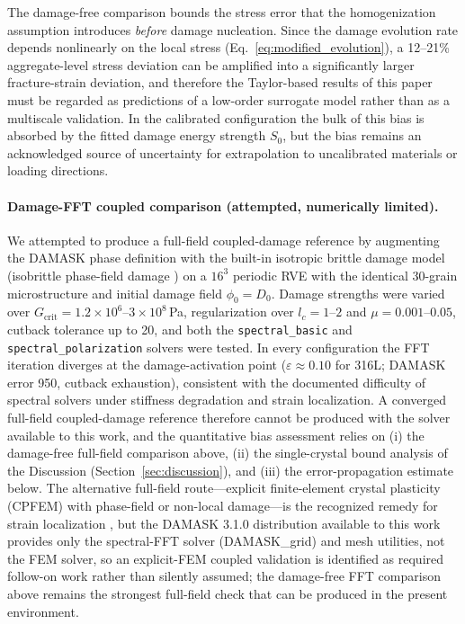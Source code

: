 \documentclass[12pt,a4paper,twocolumn]{article}
\begin{document}
The damage-free comparison bounds the stress error that the homogenization assumption introduces \emph{before} damage nucleation. Since the damage evolution rate depends nonlinearly on the local stress (Eq.~\eqref{eq:modified_evolution}), a 12--21\% aggregate-level stress deviation can be amplified into a significantly larger fracture-strain deviation, and therefore the Taylor-based results of this paper must be regarded as predictions of a low-order surrogate model rather than as a multiscale validation. In the calibrated configuration the bulk of this bias is absorbed by the fitted damage energy strength $S_0$, but the bias remains an acknowledged source of uncertainty for extrapolation to uncalibrated materials or loading directions.

\paragraph{Damage-FFT coupled comparison (attempted, numerically limited).} We attempted to produce a full-field coupled-damage reference by augmenting the DAMASK phase definition with the built-in isotropic brittle damage model (isobrittle phase-field damage \cite{shanthraj2017phase}) on a $16^3$ periodic RVE with the identical 30-grain microstructure and initial damage field $\phi_0 = D_0$. Damage strengths were varied over $G_{\mathrm{crit}} = 1.2\times10^6$--$3\times10^8$\,Pa, regularization over $l_c = 1$--$2$ and $\mu = 0.001$--$0.05$, cutback tolerance up to 20, and both the \texttt{spectral\_basic} and \texttt{spectral\_polarization} solvers were tested. In every configuration the FFT iteration diverges at the damage-activation point ($\varepsilon \approx 0.10$ for 316L; DAMASK error 950, cutback exhaustion), consistent with the documented difficulty of spectral solvers under stiffness degradation and strain localization. A converged full-field coupled-damage reference therefore cannot be produced with the solver available to this work, and the quantitative bias assessment relies on (i) the damage-free full-field comparison above, (ii) the single-crystal bound analysis of the Discussion (Section~\ref{sec:discussion}), and (iii) the error-propagation estimate below. The alternative full-field route---explicit finite-element crystal plasticity (CPFEM) with phase-field or non-local damage---is the recognized remedy for strain localization \cite{liu2022phase,shanthraj2017phase}, but the DAMASK 3.1.0 distribution available to this work provides only the spectral-FFT solver (DAMASK\_grid) and mesh utilities, not the FEM solver, so an explicit-FEM coupled validation is identified as required follow-on work rather than silently assumed; the damage-free FFT comparison above remains the strongest full-field check that can be produced in the present environment.
\end{document}

